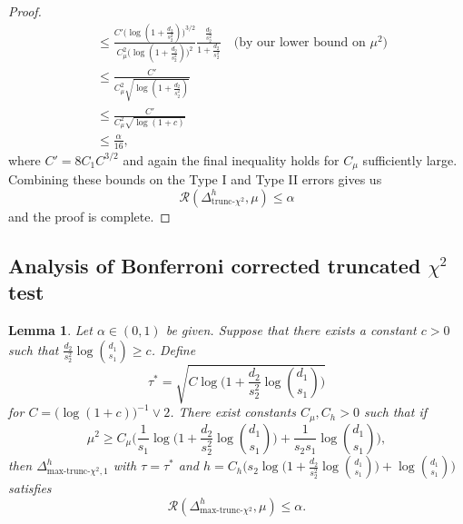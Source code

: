\documentclass{article}
\newcommand{\cR}{\mathcal{R}}
\newcommand{\chisqlin}{\text{trunc-$\chi^2$}}
\newcommand{\chisqmax}{\text{max-trunc-$\chi^2$}}
\newtheorem{lemma}{Lemma}
\theoremstyle{remark}
\begin{document}
\begin{proof}
\begin{align*}
        &\leq \frac{C'\big(\log(1 + \frac{d_2}{s_2^2})\big)^{3/2}}{C_\mu^2\big(\log(1 + \frac{d_2}{s_2^2})\big)^2}\frac{\frac{d_2}{s_2^2}}{1 + \frac{d_2}{s_2^2}} \quad \text{(by our lower bound on $\mu^2$)}\\ 
        &\leq \frac{C'}{C_\mu^2 \sqrt{\log(1 + \frac{d_2}{s_2^2})}} \\
        &\leq \frac{C'}{C_\mu^2 \sqrt{\log(1 + c)}} \\
        &\leq \frac{\alpha}{16},
    \end{align*}
    where $C' = 8C_1C^{3/2}$ and again the final inequality holds for $C_\mu$ sufficiently large. Combining these bounds on the Type I and Type II errors gives us
    \[\cR(\Delta_{\chisqlin}^h, \mu) \leq \alpha\]
    and the proof is complete.
\end{proof}
\subsection{Analysis of Bonferroni corrected truncated $\chi^2$ test}
\begin{lemma}\label{lem:max-trunc-test}
    Let $\alpha \in (0,1)$ be given. Suppose that there exists a constant $c > 0$ such that $\frac{d_2}{s_2^2}\log {d_1 \choose s_1} \geq c$. Define
    \[\tau^* = \sqrt{C\log\Big(1 + \frac{d_2}{s_2^2}\log {d_1 \choose s_1}\Big)}\]
    for $C = \big(\log(1 + c)\big)^{-1} \lor 2$. There exist constants $C_\mu, C_h > 0$ such that if
    \[\mu^2 \geq C_\mu\Bigg(\frac{1}{s_1}\log\Big(1 + \frac{d_2}{s_2^2}\log {d_1 \choose s_1}\Big) + \frac{1}{s_2s_1}\log {d_1 \choose s_1}\Bigg),\]
    then $\Delta_{\chisqmax, 1}^h$ with $\tau = \tau^*$ and $h = C_h\Big(s_2\log\Big(1 + \frac{d_2}{s_2^2}\log {d_1 \choose s_1}\Big) + \log {d_1 \choose s_1}\Big)$ satisfies 
    \[\cR(\Delta_{\chisqmax}^h, \mu) \leq \alpha.\]
\end{lemma}
\end{document}
